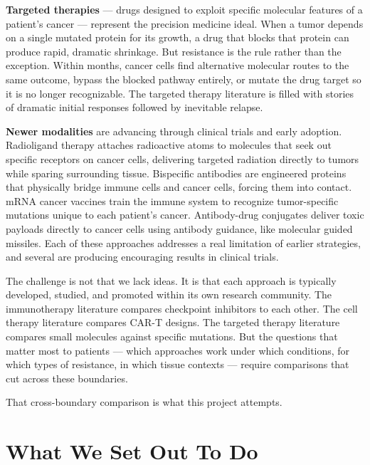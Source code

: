 \documentclass[11pt,twoside,openright]{report}
\begin{document}
\textbf{Targeted therapies} --- drugs designed to exploit specific molecular features of a patient's cancer --- represent the precision medicine ideal. When a tumor depends on a single mutated protein for its growth, a drug that blocks that protein can produce rapid, dramatic shrinkage. But resistance is the rule rather than the exception. Within months, cancer cells find alternative molecular routes to the same outcome, bypass the blocked pathway entirely, or mutate the drug target so it is no longer recognizable. The targeted therapy literature is filled with stories of dramatic initial responses followed by inevitable relapse.

\textbf{Newer modalities} are advancing through clinical trials and early adoption. Radioligand therapy attaches radioactive atoms to molecules that seek out specific receptors on cancer cells, delivering targeted radiation directly to tumors while sparing surrounding tissue. Bispecific antibodies are engineered proteins that physically bridge immune cells and cancer cells, forcing them into contact. mRNA cancer vaccines train the immune system to recognize tumor-specific mutations unique to each patient's cancer. Antibody-drug conjugates deliver toxic payloads directly to cancer cells using antibody guidance, like molecular guided missiles. Each of these approaches addresses a real limitation of earlier strategies, and several are producing encouraging results in clinical trials.

The challenge is not that we lack ideas. It is that each approach is typically developed, studied, and promoted within its own research community. The immunotherapy literature compares checkpoint inhibitors to each other. The cell therapy literature compares CAR-T designs. The targeted therapy literature compares small molecules against specific mutations. But the questions that matter most to patients --- which approaches work under which conditions, for which types of resistance, in which tissue contexts --- require comparisons that cut across these boundaries.

That cross-boundary comparison is what this project attempts.

\chapter{What We Set Out To Do}

\end{document}
